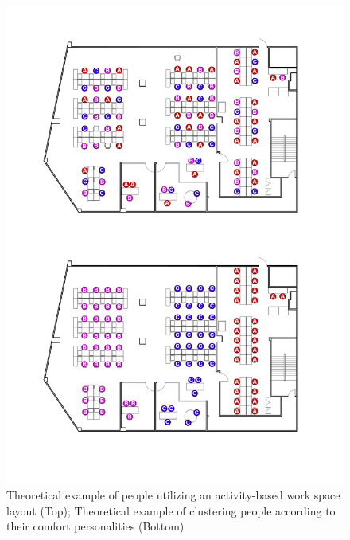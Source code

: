 \documentclass[]{interact}
\theoremstyle{plain}%
\theoremstyle{definition}
\theoremstyle{remark}
\begin{document}
\begin{figure}
\centering
\includegraphics[scale=0.3]{figures/conventional_vs_recommedation.jpg}
\caption{Theoretical example of people utilizing an activity-based work space layout (Top); Theoretical example of clustering people according to their comfort personalities (Bottom)} 
\label{space-plans}
\end{figure}
\end{document}
